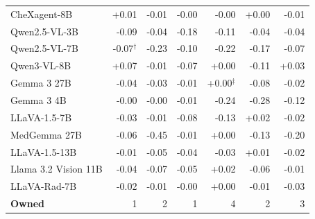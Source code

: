 \documentclass{article}
\providecommand{\DIFaddendFL}{} %
\DeclareRobustCommand{\DIFaddendFL}{\DIFOaddendFL \let\includegraphics\DIFOincludegraphics} %
\begin{document}
\begin{table}[htbp]
{\begin{tabular}{lrrrrrr}
CheXagent-8B & \cellcolor{cfTerra1}+0.01 & \cellcolor{cfSlate1}-0.01 & \cellcolor{cfSlate1}-0.00 & \cellcolor{cfSlate1}-0.00 & \cellcolor{cfTerra1}+0.00 & \cellcolor{cfSlate1}-0.01 \\
Qwen2.5-VL-3B & \cellcolor{cfSlate2}-0.09 & \cellcolor{cfSlate2}-0.04 & \cellcolor{cfSlate3}-0.18 & \cellcolor{cfSlate3}-0.11 & \cellcolor{cfSlate2}-0.04 & \cellcolor{cfSlate2}-0.04 \\
Qwen2.5-VL-7B & \cellcolor{cfSlate2}-0.07$^{\dagger}$ & \cellcolor{cfSlate3}-0.23 & \cellcolor{cfSlate3}-0.10 & \cellcolor{cfSlate3}-0.22 & \cellcolor{cfSlate3}-0.17 & \cellcolor{cfSlate2}-0.07 \\
Qwen3-VL-8B & \cellcolor{cfTerra2}+0.07 & \cellcolor{cfSlate1}-0.01 & \cellcolor{cfSlate2}-0.07 & \cellcolor{cfTerra1}+0.00 & \cellcolor{cfSlate3}-0.11 & \cellcolor{cfTerra2}+0.03 \\
Gemma 3 27B & \cellcolor{cfSlate2}-0.04 & \cellcolor{cfSlate2}-0.03 & \cellcolor{cfSlate1}-0.01 & \cellcolor{cfTerra1}+0.00$^{\ddagger}$ & \cellcolor{cfSlate2}-0.08 & \cellcolor{cfSlate1}-0.02 \\
Gemma 3 4B & \cellcolor{cfSlate1}-0.00 & \cellcolor{cfSlate1}-0.00 & \cellcolor{cfSlate1}-0.01 & \cellcolor{cfSlate3}-0.24 & \cellcolor{cfSlate4}-0.28 & \cellcolor{cfSlate3}-0.12 \\
LLaVA-1.5-7B & \cellcolor{cfSlate2}-0.03 & \cellcolor{cfSlate1}-0.01 & \cellcolor{cfSlate2}-0.08 & \cellcolor{cfSlate3}-0.13 & \cellcolor{cfTerra2}+0.02 & \cellcolor{cfSlate1}-0.02 \\
MedGemma 27B & \cellcolor{cfSlate2}-0.06 & \cellcolor{cfSlate4}-0.45 & \cellcolor{cfSlate1}-0.01 & \cellcolor{cfTerra1}+0.00 & \cellcolor{cfSlate3}-0.13 & \cellcolor{cfSlate3}-0.20 \\
LLaVA-1.5-13B & \cellcolor{cfSlate1}-0.01 & \cellcolor{cfSlate2}-0.05 & \cellcolor{cfSlate2}-0.04 & \cellcolor{cfSlate2}-0.03 & \cellcolor{cfTerra1}+0.01 & \cellcolor{cfSlate1}-0.02 \\
Llama 3.2 Vision 11B & \cellcolor{cfSlate2}-0.04 & \cellcolor{cfSlate2}-0.07 & \cellcolor{cfSlate2}-0.05 & \cellcolor{cfTerra2}+0.02 & \cellcolor{cfSlate2}-0.06 & \cellcolor{cfSlate1}-0.01 \\
LLaVA-Rad-7B & \cellcolor{cfSlate1}-0.02 & \cellcolor{cfSlate1}-0.01 & \cellcolor{cfSlate1}-0.00 & \cellcolor{cfTerra1}+0.00 & \cellcolor{cfSlate1}-0.01 & \cellcolor{cfSlate2}-0.03 \\
\midrule
\textbf{Owned} & 1 & 2 & 1 & 4 & 2 & 3 \\
\bottomrule
\end{tabular}}
\DIFaddendFL \end{table}
\end{document}
